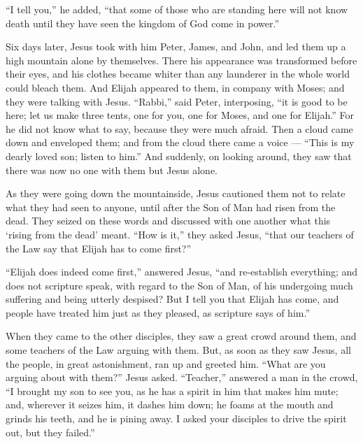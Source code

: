  ``I tell you,'' he added, ``that some of those who are
standing here will not know death until they have seen the kingdom of
God come in power.''

 Six days later, Jesus took with him Peter, James, and John,
and led them up a high mountain alone by themselves. There his
appearance was transformed before their eyes,  and his
clothes became whiter than any launderer in the whole world could bleach
them.  And Elijah appeared to them, in company with Moses;
and they were talking with Jesus.  ``Rabbi,'' said Peter,
interposing, ``it is good to be here; let us make three tents, one for
you, one for Moses, and one for Elijah.''  For he did not
know what to say, because they were much afraid.  Then a
cloud came down and enveloped them; and from the cloud there came a
voice --- ``This is my dearly loved son; listen to him.'' 
And suddenly, on looking around, they saw that there was now no one with
them but Jesus alone.

 As they were going down the mountainside, Jesus cautioned
them not to relate what they had seen to anyone, until after the Son of
Man had risen from the dead.  They seized on these words
and discussed with one another what this `rising from the dead' meant.
 ``How is it,'' they asked Jesus, ``that our teachers of
the Law say that Elijah has to come first?''

 ``Elijah does indeed come first,'' answered Jesus, ``and
re-establish everything; and does not scripture speak, with regard to
the Son of Man, of his undergoing much suffering and being utterly
despised?  But I tell you that Elijah has come, and people
have treated him just as they pleased, as scripture says of him.''

 When they came to the other disciples, they saw a great
crowd around them, and some teachers of the Law arguing with them.
 But, as soon as they saw Jesus, all the people, in great
astonishment, ran up and greeted him.  ``What are you
arguing about with them?'' Jesus asked.  ``Teacher,''
answered a man in the crowd, ``I brought my son to see you, as he has a
spirit in him that makes him mute;  and, wherever it seizes
him, it dashes him down; he foams at the mouth and grinds his teeth, and
he is pining away. I asked your disciples to drive the spirit out, but
they failed.''

